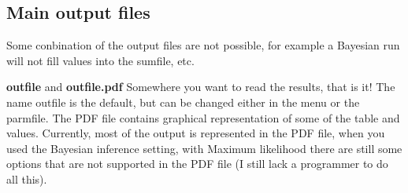 \subsection{Main output files}
Some conbination of the output files are not possible, for example a Bayesian run will not fill values into the sumfile, etc.
\begin{description}
\item{\bf outfile} and {\bf outfile.pdf}  Somewhere you want to read the results, that is it! The name outfile is the default, but can be changed either in the menu or the parmfile. The PDF file contains graphical representation of some of the table and values. Currently, most of the output is represented in the PDF file, when you used the Bayesian inference setting, with Maximum likelihood there are still some options that are not supported in the PDF file (I still lack a programmer to do all this).
\end{description}

